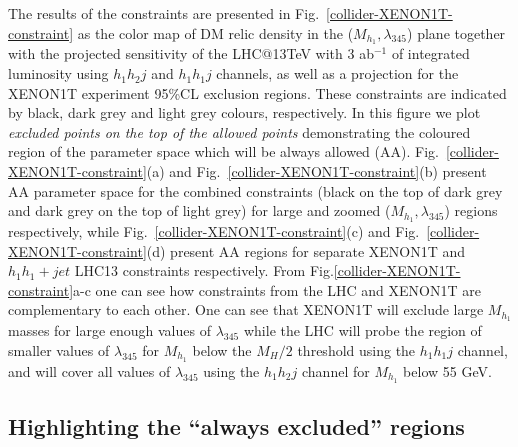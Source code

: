 \documentclass[12pt,a4paper]{article}
\begin{document}
%
The results of the constraints are presented in Fig.~\ref{collider-XENON1T-constraint} as the color map of DM relic density
in the ($M_{h_1},\lambda_{345}$)  plane together with the projected sensitivity of the LHC@13TeV with 3 ab$^{-1}$ of integrated luminosity 
using  $h_1 h_2 j$  and  $h_1 h_1 j$ channels, as well as a projection for the XENON1T experiment
95\%CL exclusion regions. These constraints are indicated by black, dark grey and light grey colours, respectively.
In this figure we plot {\it excluded points on the top of the allowed points}   demonstrating the coloured region of the parameter space which will be always allowed (AA).
Fig.~\ref{collider-XENON1T-constraint}(a) and Fig.~\ref{collider-XENON1T-constraint}(b)
present AA parameter space for the combined constraints (black on the top of dark grey and dark grey on the top of light grey) for 
large and zoomed ($M_{h_1},\lambda_{345}$) regions respectively,
while  Fig.~\ref{collider-XENON1T-constraint}(c) and  Fig.~\ref{collider-XENON1T-constraint}(d)
present AA regions for separate  XENON1T and $h_1h_1+jet$ LHC13 constraints
respectively. From Fig.\ref{collider-XENON1T-constraint}a-c 
one can see how constraints from the LHC and XENON1T are complementary to each other.
One can see that XENON1T will exclude large $M_{h_1}$ masses
for large enough values of  $\lambda_{345}$ while the LHC will probe the region of smaller values of  $\lambda_{345}$ for $M_{h_1}$ below the $M_H/2$ threshold using the
$h_1h_1j$ channel, and will cover all values of $\lambda_{345}$
using the $h_1h_2j$ channel for  $M_{h_1}$ below 55 GeV.

\subsection{Highlighting the ``always excluded'' regions}
\end{document}
